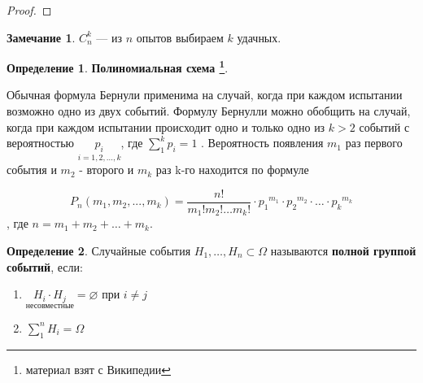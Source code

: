 \documentclass[a4paper, 12pt]{article}
\theoremstyle{definition}
\newtheorem{Definition}{Определение}
\newtheorem{Note}{Замечание}
\begin{document}
    \begin{proof}
        \leavevmode
    \end{proof}

    \begin{Note}
        \(C^{k}_{n}\) --- из \(n\) опытов выбираем \(k\) удачных.
    \end{Note}

    \begin{Definition}
        \textbf{Полиномиальная схема \footnote{материал взят с Википедии}}.

        Обычная формула Бернули применима на случай, когда при каждом испытании возможно одно из двух событий. Формулу Бернулли
        можно обобщить на случай, когда при каждом испытании происходит одно и только одно из  \(k > 2\)  событий с вероятностью
        \(\underset{i = 1, 2, \ldots, k}{p_i}\), где \(\sum^{k}_{1} p_i = 1\) . Вероятность появления  \(m_1\)  раз первого события
        и  \(m_2\)  - второго и  \(m_k\)  раз k-го находится по формуле

        \[P_n(m_1,m_2,...,m_k)= \frac{n!}{m_1! m_2! \ldots m_k!} \cdot {p_1}^{m_1} \cdot {p_2}^{m_2} \cdot \ldots \cdot {p_k}^{m_k}\]
        , где  \(n = m_1 + m_2 + \ldots +m_k\). 
    \end{Definition}

    \begin{Definition}
        Случайные события \(H_1, \ldots, H_n \subset \Omega\) называются \textbf{полной группой событий}, если:
            \begin{enumerate}
                \item
                    \(\underset{\text{несовместные}}{H_i \cdot H_j} = \varnothing\) при \(i \neq j\)
                \item
                    \(\sum^{n}_{1} H_i = \Omega\)
            \end{enumerate}
    \end{Definition}
\end{document}
